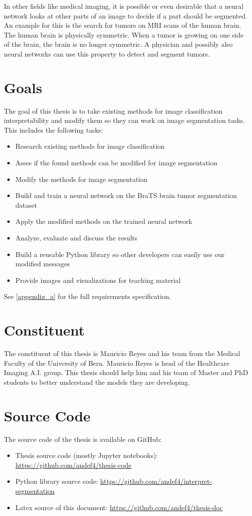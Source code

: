 In other fields like medical imaging, it is possible or even desirable that a neural network looks at other parts of an image to decide if a part should be segmented. An example for this is the search for tumors on MRI scans of the human brain. The human brain is physically symmetric. When a tumor is growing on one side of the brain, the brain is no longer symmetric. A physician and possibly also neural networks can use this property to detect and segment tumors.

\section{Goals}
The goal of this thesis is to take existing methods for image classification interpretability and modify them so they can work on image segmentation tasks. This includes the following tasks:
\begin{itemize}
    \item Research existing methods for image classification
    \item Asses if the found methods can be modified for image segmentation
    \item Modify the methods for image segmentation
    \item Build and train a neural network on the BraTS brain tumor segmentation dataset
    \item Apply the modified methods on the trained neural network
    \item Analyze, evaluate and discuss the results
    \item Build a reusable Python library so other developers can easily use our modified messages
    \item Provide images and visualizations for teaching material
\end{itemize}

See \autoref{appendix_a} for the full requirements specification.

\section{Constituent}
The constituent of this thesis is Mauricio Reyes and his team from the Medical Faculty of the University of Bern. Mauricio Reyes is head of the Healthcare Imaging A.I. group. This thesis should help him and his team of Master and PhD students to better understand the models they are developing.

\section{Source Code}
The source code of the thesis is available on GitHub:
\begin{itemize}
    \item Thesis source code (mostly Jupyter notebooks): \url{https://github.com/andef4/thesis-code}
    \item Python library source code: \url{https://github.com/andef4/interpret-segmentation}
    \item Latex source of this document: \url{https://github.com/andef4/thesis-doc}
\end{itemize}


